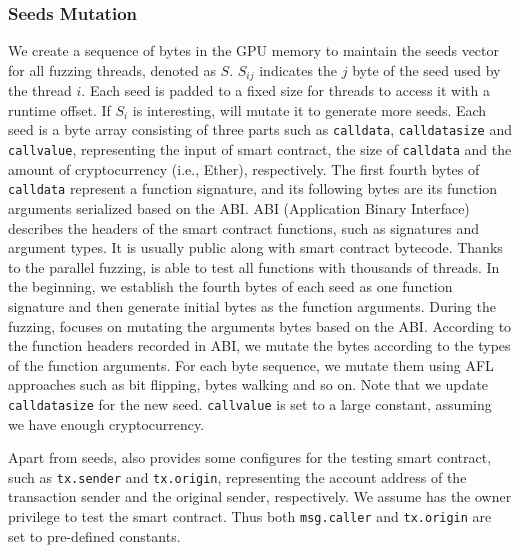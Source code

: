 \subsubsection{Seeds Mutation}
\label{design:mutation}
We create a sequence of bytes in the GPU memory to maintain the seeds vector for all fuzzing threads, denoted as $S$.  
$S_{ij}$ indicates the $j$ byte of the seed used by the thread $i$.  
Each seed is padded to a fixed size for threads to access it with a runtime offset.
If $S_i$ is interesting, {\runner} will mutate it to generate more seeds. 
Each seed is a byte array consisting of three parts such as \texttt{calldata}, \texttt{calldatasize} and \texttt{callvalue}, representing the input of smart contract, the size of \texttt{calldata} and the amount of cryptocurrency (i.e., Ether), respectively.  
%
The first fourth bytes of \texttt{calldata} represent a function signature, and its following bytes are its function arguments serialized based on the ABI\cite{abi}.
ABI (Application Binary Interface) describes the headers of the smart contract functions, such as signatures and argument types. 
It is usually public along with smart contract bytecode.
%
Thanks to the parallel fuzzing, {\runner} is able to test all functions with thousands of threads. 
In the beginning, we establish the fourth bytes of each seed as one function signature and then generate initial bytes as the function arguments.
During the fuzzing, {\runner} focuses on mutating the arguments bytes based on the ABI.
%
%
%
%
%
According to the function headers recorded in ABI, we mutate the bytes according to the types of the function arguments. 
For each byte sequence, we mutate them using AFL\cite{afl} approaches such as bit flipping, bytes walking and so on.
Note that we update \texttt{calldatasize} for the new seed. \texttt{callvalue} is set to a large constant, assuming we have enough cryptocurrency. 

Apart from seeds, {\runner} also provides some configures for the testing smart contract, such as  \texttt{tx.sender} and \texttt{tx.origin}, representing the account address of the transaction sender and the original sender, respectively. 
We assume {\tool} has the owner privilege to test the smart contract. Thus both \texttt{msg.caller} and \texttt{tx.origin} are set to pre-defined constants.
    

